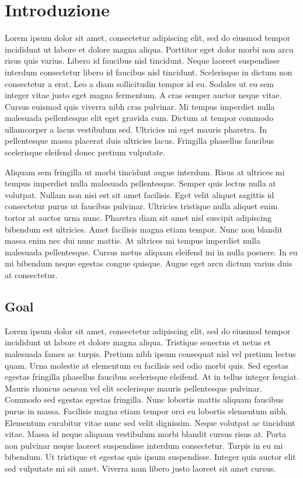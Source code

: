 \chapter{Introduzione}
\label{sec:introduction}

Lorem ipsum dolor sit amet, consectetur adipiscing elit, sed do eiusmod tempor incididunt ut labore et dolore magna aliqua. Porttitor eget dolor morbi non arcu risus quis varius. Libero id faucibus nisl tincidunt. Neque laoreet suspendisse interdum consectetur libero id faucibus nisl tincidunt. Scelerisque in dictum non consectetur a erat. Leo a diam sollicitudin tempor id eu. Sodales ut eu sem integer vitae justo eget magna fermentum. A cras semper auctor neque vitae. Cursus euismod quis viverra nibh cras pulvinar. Mi tempus imperdiet nulla malesuada pellentesque elit eget gravida cum. Dictum at tempor commodo ullamcorper a lacus vestibulum sed. Ultricies mi eget mauris pharetra. In pellentesque massa placerat duis ultricies lacus. Fringilla phasellus faucibus scelerisque eleifend donec pretium vulputate.

Aliquam sem fringilla ut morbi tincidunt augue interdum. Risus at ultrices mi tempus imperdiet nulla malesuada pellentesque. Semper quis lectus nulla at volutpat. Nullam non nisi est sit amet facilisis. Eget velit aliquet sagittis id consectetur purus ut faucibus pulvinar. Ultricies tristique nulla aliquet enim tortor at auctor urna nunc. Pharetra diam sit amet nisl suscipit adipiscing bibendum est ultricies. Amet facilisis magna etiam tempor. Nunc non blandit massa enim nec dui nunc mattis. At ultrices mi tempus imperdiet nulla malesuada pellentesque. Cursus metus aliquam eleifend mi in nulla posuere. In eu mi bibendum neque egestas congue quisque. Augue eget arcu dictum varius duis at consectetur.

\section[Goal]{Goal} %

Lorem ipsum dolor sit amet, consectetur adipiscing elit, sed do eiusmod tempor incididunt ut labore et dolore magna aliqua. Tristique senectus et netus et malesuada fames ac turpis. Pretium nibh ipsum consequat nisl vel pretium lectus quam. Urna molestie at elementum eu facilisis sed odio morbi quis. Sed egestas egestas fringilla phasellus faucibus scelerisque eleifend. At in tellus integer feugiat. Mauris rhoncus aenean vel elit scelerisque mauris pellentesque pulvinar. Commodo sed egestas egestas fringilla. Nunc lobortis mattis aliquam faucibus purus in massa. Facilisis magna etiam tempor orci eu lobortis elementum nibh. Elementum curabitur vitae nunc sed velit dignissim. Neque volutpat ac tincidunt vitae. Massa id neque aliquam vestibulum morbi blandit cursus risus at. Porta non pulvinar neque laoreet suspendisse interdum consectetur. Turpis in eu mi bibendum. Ut tristique et egestas quis ipsum suspendisse. Integer quis auctor elit sed vulputate mi sit amet. Viverra nam libero justo laoreet sit amet cursus.


